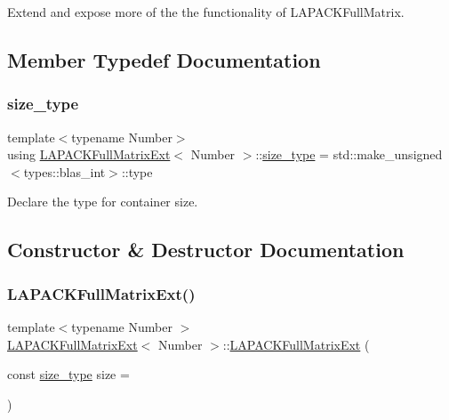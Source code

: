 Extend and expose more of the the functionality of L\+A\+P\+A\+C\+K\+Full\+Matrix. 

\subsection{Member Typedef Documentation}
\mbox{\label{classLAPACKFullMatrixExt_a5cf5f4a6104dc17029210b5ca52bf574}} 
\subsubsection{\texorpdfstring{size\+\_\+type}{size\_type}}
{\footnotesize\ttfamily template$<$typename Number$>$ \\
using \hyperlink{classLAPACKFullMatrixExt}{L\+A\+P\+A\+C\+K\+Full\+Matrix\+Ext}$<$ Number $>$\+::\hyperlink{classLAPACKFullMatrixExt_a5cf5f4a6104dc17029210b5ca52bf574}{size\+\_\+type} =  std\+::make\+\_\+unsigned$<$types\+::blas\+\_\+int$>$\+::type}

Declare the type for container size. 

\subsection{Constructor \& Destructor Documentation}
\mbox{\label{classLAPACKFullMatrixExt_a1d2edf7f0eb1f079e1d9540f89b6584e}} 
\subsubsection{\texorpdfstring{L\+A\+P\+A\+C\+K\+Full\+Matrix\+Ext()}{LAPACKFullMatrixExt()}\hspace{0.1cm}{\footnotesize\ttfamily [1/10]}}
{\footnotesize\ttfamily template$<$typename Number $>$ \\
\hyperlink{classLAPACKFullMatrixExt}{L\+A\+P\+A\+C\+K\+Full\+Matrix\+Ext}$<$ Number $>$\+::\hyperlink{classLAPACKFullMatrixExt}{L\+A\+P\+A\+C\+K\+Full\+Matrix\+Ext} (\begin{DoxyParamCaption}\item[{const \hyperlink{classLAPACKFullMatrixExt_a5cf5f4a6104dc17029210b5ca52bf574}{size\+\_\+type}}]{size = {} }\end{DoxyParamCaption})}

